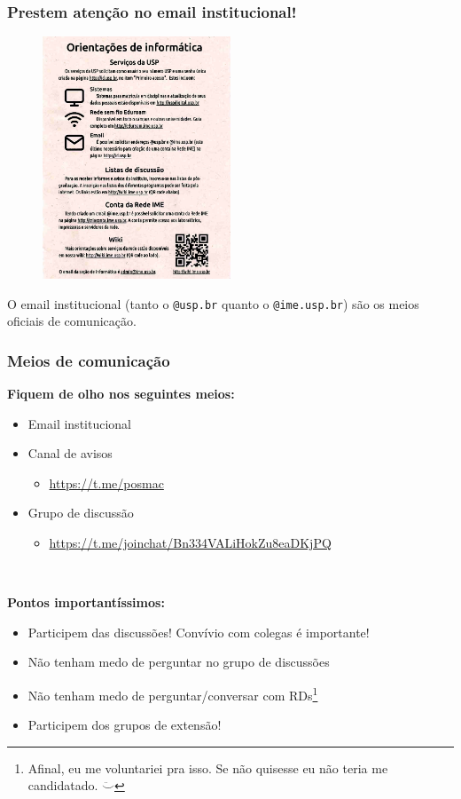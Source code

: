 \documentclass{beamer}
\begin{document}
\begin{frame}[fragile]
  \frametitle{Prestem atenção no email institucional!}

  \begin{figure}
    \centering\includegraphics[width=0.5\textwidth]{imgs/email.png}
  \end{figure}

  O email institucional (tanto o \texttt{@usp.br} quanto o \texttt{@ime.usp.br}) são os meios
  oficiais de comunicação.
\end{frame}

\begin{frame}
  \frametitle{Meios de comunicação}

  \textbf{Fiquem de olho nos seguintes meios:}
  \begin{itemize}
    \item Email institucional
    \item Canal de avisos
      \begin{itemize}
        \item \url{https://t.me/posmac}
      \end{itemize}
    \item Grupo de discussão
      \begin{itemize}
        \item \url{https://t.me/joinchat/Bn334VALiHokZu8eaDKjPQ}
      \end{itemize}
  \end{itemize}~\\\pause

  \textbf{Pontos importantíssimos:}
  \begin{itemize}
    \item Participem das discussões! Convívio com colegas é importante!
    \item Não tenham medo de perguntar no grupo de discussões
    \item Não tenham medo de perguntar/conversar com RDs\footnote{Afinal, eu me voluntariei pra
      isso. Se não quisesse eu não teria me candidatado. $\ddot\smile$}
    \item Participem dos grupos de extensão!
  \end{itemize}
\end{frame}
\end{document}

